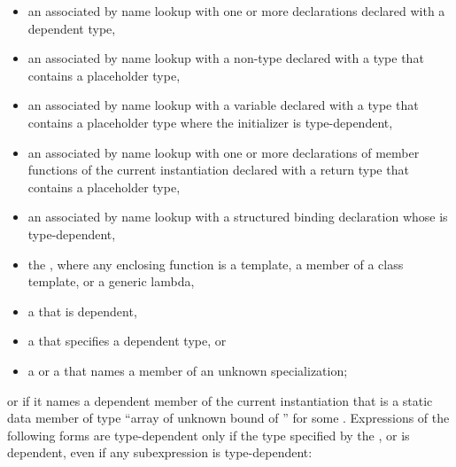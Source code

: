 \begin{itemize}
\item
an
associated by name lookup with one or more declarations
declared with a dependent type,

\item
an
associated by name lookup with
a non-type 
declared with a type
that contains a placeholder type,

\item
an
associated by name lookup with
a variable declared with a type that contains a placeholder type
where the initializer is type-dependent,

\item
an  associated by name lookup with one or more
declarations of member functions of the current instantiation declared
with a return type that contains a placeholder type,

\item
an  associated by name lookup with
a structured binding declaration whose
 is type-dependent,

\item
the
, where any enclosing function is a
template, a member of a class template, or a generic lambda,

\item
a
that is dependent,

\item
a
that specifies a dependent type, or

\item
a
or a
that names a member of an unknown specialization;
\end{itemize}

or if it names a dependent member of the current instantiation that is a static
data member of type
``array of unknown bound of '' for some .
Expressions of the following forms are type-dependent only if the type
specified by the
,
or
is dependent, even if any subexpression is type-dependent:

